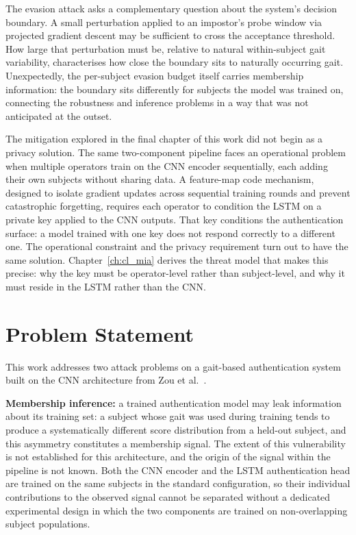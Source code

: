 The evasion attack asks a complementary question about the system's decision boundary. A small perturbation applied to an impostor's probe window via projected gradient descent may be sufficient to cross the acceptance threshold. How large that perturbation must be, relative to natural within-subject gait variability, characterises how close the boundary sits to naturally occurring gait. Unexpectedly, the per-subject evasion budget itself carries membership information: the boundary sits differently for subjects the model was trained on, connecting the robustness and inference problems in a way that was not anticipated at the outset.

The mitigation explored in the final chapter of this work did not begin as a privacy solution. The same two-component pipeline faces an operational problem when multiple operators train on the CNN encoder sequentially, each adding their own subjects without sharing data. A feature-map code mechanism, designed to isolate gradient updates across sequential training rounds and prevent catastrophic forgetting, requires each operator to condition the LSTM on a private key applied to the CNN outputs. That key conditions the authentication surface: a model trained with one key does not respond correctly to a different one. The operational constraint and the privacy requirement turn out to have the same solution. Chapter~\ref{ch:cl_mia} derives the threat model that makes this precise: why the key must be operator-level rather than subject-level, and why it must reside in the LSTM rather than the CNN.

\section{Problem Statement}
\label{sec:intro_problem}

This work addresses two attack problems on a gait-based authentication system built on the CNN architecture from Zou et al.~\cite{zou2020deep}.

\textbf{Membership inference:} a trained authentication model may leak information about its training set: a subject whose gait was used during training tends to produce a systematically different score distribution from a held-out subject, and this asymmetry constitutes a membership signal. The extent of this vulnerability is not established for this architecture, and the origin of the signal within the pipeline is not known. Both the CNN encoder and the LSTM authentication head are trained on the same subjects in the standard configuration, so their individual contributions to the observed signal cannot be separated without a dedicated experimental design in which the two components are trained on non-overlapping subject populations.

